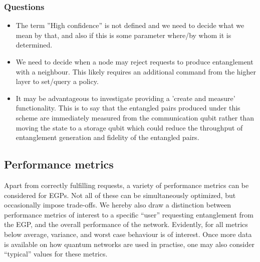 \documentclass{article}
\begin{document}
\subsubsection{Questions}
\begin{itemize}
\item The term ''High confidence'' is not defined and we need to decide what we mean by that, and also if this is some parameter where/by whom it is determined.
\item We need to decide when a node may reject requests to produce entanglement with a neighbour. This likely requires an additional command from the higher layer to set/query a policy.
\item It may be advantageous to investigate providing a 'create and measure' functionality.  This is to say that the entangled pairs produced under this scheme are immediately measured
      from the communication qubit rather than moving the state to a storage qubit which could reduce the throughput of entanglement generation and fidelity of the entangled pairs.
\end{itemize}

\subsection{Performance metrics}

Apart from correctly fulfilling requests, a variety of performance metrics can be considered for EGPs. Not all of these can be simultaneously optimized, but occasionally impose trade-offs.
We hereby also draw a distinction between performance metrics of interest to a specific ``user'' requesting entanglement from the EGP, and the overall performance of the network.
Evidently, for all metrics below average, variance, and worst case behaviour is of interest. Once more data is available on how quantum networks are used in practise, one may also consider ``typical'' values for these metrics.
\end{document}
